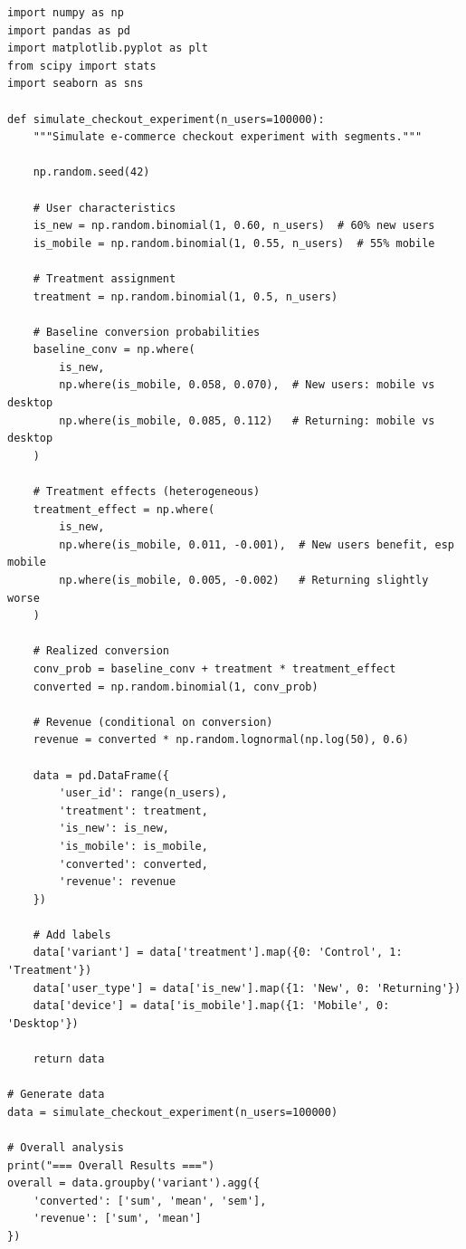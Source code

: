 \lstset{language=Python, caption=Heterogeneous Treatment Effect Analysis}
\begin{lstlisting}
import numpy as np
import pandas as pd
import matplotlib.pyplot as plt
from scipy import stats
import seaborn as sns

def simulate_checkout_experiment(n_users=100000):
    """Simulate e-commerce checkout experiment with segments."""

    np.random.seed(42)

    # User characteristics
    is_new = np.random.binomial(1, 0.60, n_users)  # 60% new users
    is_mobile = np.random.binomial(1, 0.55, n_users)  # 55% mobile

    # Treatment assignment
    treatment = np.random.binomial(1, 0.5, n_users)

    # Baseline conversion probabilities
    baseline_conv = np.where(
        is_new,
        np.where(is_mobile, 0.058, 0.070),  # New users: mobile vs desktop
        np.where(is_mobile, 0.085, 0.112)   # Returning: mobile vs desktop
    )

    # Treatment effects (heterogeneous)
    treatment_effect = np.where(
        is_new,
        np.where(is_mobile, 0.011, -0.001),  # New users benefit, esp mobile
        np.where(is_mobile, 0.005, -0.002)   # Returning slightly worse
    )

    # Realized conversion
    conv_prob = baseline_conv + treatment * treatment_effect
    converted = np.random.binomial(1, conv_prob)

    # Revenue (conditional on conversion)
    revenue = converted * np.random.lognormal(np.log(50), 0.6)

    data = pd.DataFrame({
        'user_id': range(n_users),
        'treatment': treatment,
        'is_new': is_new,
        'is_mobile': is_mobile,
        'converted': converted,
        'revenue': revenue
    })

    # Add labels
    data['variant'] = data['treatment'].map({0: 'Control', 1: 'Treatment'})
    data['user_type'] = data['is_new'].map({1: 'New', 0: 'Returning'})
    data['device'] = data['is_mobile'].map({1: 'Mobile', 0: 'Desktop'})

    return data

# Generate data
data = simulate_checkout_experiment(n_users=100000)

# Overall analysis
print("=== Overall Results ===")
overall = data.groupby('variant').agg({
    'converted': ['sum', 'mean', 'sem'],
    'revenue': ['sum', 'mean']
})


\end{lstlisting}
